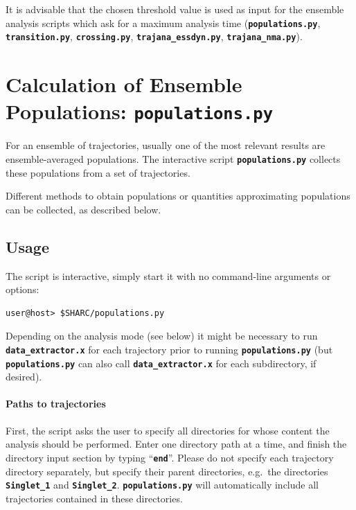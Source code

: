 \documentclass[a4paper,10pt,DIV=15,openany]{scrbook}
\newcommand{\ttt}[1]{\textbf{\texttt{#1}}}
\begin{document}
It is advisable that the chosen threshold value is used as input for the ensemble analysis scripts which ask for a maximum analysis time (\ttt{populations.py}, \ttt{transition.py}, \ttt{crossing.py}, \ttt{trajana\_essdyn.py}, \ttt{trajana\_nma.py}).







\section{Calculation of Ensemble Populations: \ttt{populations.py}}\label{sec:populations.py}

For an ensemble of trajectories, usually one of the most relevant results are ensemble-averaged populations. The interactive script \ttt{populations.py} collects these populations from a set of trajectories. 

Different methods to obtain populations or quantities approximating populations can be collected, as described below.

\subsection{Usage}

The script is interactive, simply start it with no command-line arguments or options:
\begin{verbatim}
user@host> $SHARC/populations.py
\end{verbatim}

Depending on the analysis mode (see below) it might be necessary to run \ttt{data\_extractor.x} for each trajectory prior to running \ttt{populations.py} (but \ttt{populations.py} can also call \ttt{data\_extractor.x} for each subdirectory, if desired). 

\paragraph{Paths to trajectories}

First, the script asks the user to specify all directories for whose content the analysis should be performed. Enter one directory path at a time, and finish the directory input section by typing ``\ttt{end}''. Please do not specify each trajectory directory separately, but specify their parent directories, e.g.\ the directories \ttt{Singlet\_1} and \ttt{Singlet\_2}. \ttt{populations.py} will automatically include all trajectories contained in these directories.
\end{document}
